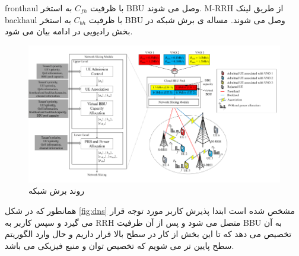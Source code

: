 fronthaul
 با ظرفیت
 $C_{fh}$
  به استخر BBU 
  وصل می شوند.
  M-RRH
   از طریق لینک
   backhaul
    با ظرفیت 
    $C_{bh}$ 
     به استخر BBU 
  وصل می شوند.
  مساله ی برش شبکه در بخش رادیویی در ادامه بیان می شود.
\begin{figure}[H]
  \centering
    \includegraphics[scale = 0.7]{./fig/dynamicNS}
  \caption{روند برش شبکه\ \cite{lee2018dynamic}}
  \label{fig:dns}
\end{figure}
همانطور که در شکل \eqref{fig:dns} 
مشخص شده است ابتدا پذیرش کاربر مورد توجه قرار می گیرد و سپس کاربر به RRH متصل می شود و پس از آن ظرفیت BBU به آن تخصیص می دهد که تا این بخش از کار در سطح بالا قرار داریم و حال وارد الگوریتم سطح پایین تر می شویم که تخصیص توان و منبع فیزیکی می باشد.


